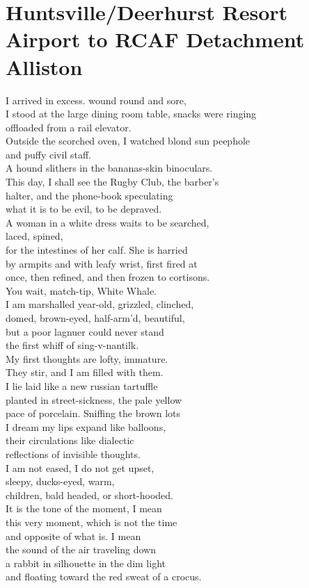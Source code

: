 \documentclass[smalldemyvopaper,11pt,twoside,onecolumn,openright,extrafontsizes]{memoir}
\begin{document}
\chapter{Huntsville/Deerhurst Resort Airport to RCAF Detachment Alliston}
I arrived in excess. wound round and sore,
\\I stood at the large dining room table, snacks were ringing
\\offloaded from a rail elevator.
\\Outside the scorched oven, I watched blond sun peephole
\\and puffy civil staff.
\\A hound slithers in the bananas-skin binoculars.
\\This day, I shall see the Rugby Club, the barber's
\\halter, and the phone-book speculating
\\what it is to be evil, to be depraved.
\\A woman in a white dress waits to be searched,
\\laced, spined,
\\for the intestines of her calf. She is harried
\\by armpits and with leafy wrist, first fired at
\\once, then refined, and then frozen to cortisons.
\\You wait, match-tip, White Whale.
\\I am marshalled year-old, grizzled, clinched,
\\domed, brown-eyed, half-arm'd, beautiful,
\\but a poor lagnuer could never stand
\\the first whiff of sing-v-nantilk.
\\My first thoughts are lofty, immature.
\\They stir, and I am filled with them.
\\I lie laid like a new russian tartuffle
\\planted in street-sickness, the pale yellow
\\pace of porcelain. Sniffing the brown lots
\\I dream my lips expand like balloons,
\\their circulations like dialectic
\\reflections of invisible thoughts.
\\I am not eased, I do not get upset,
\\sleepy, ducks-eyed, warm,
\\children, bald headed, or short-hooded.
\\It is the tone of the moment, I mean
\\this very moment, which is not the time
\\and opposite of what is. I mean
\\the sound of the air traveling down
\\a rabbit in silhouette in the dim light
\\and floating toward the red sweat of a crocus.
\end{document}

